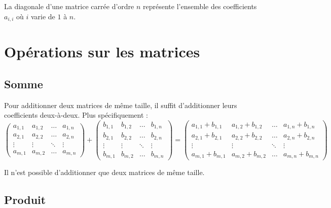 	\begin{tip}
		La diagonale d'une matrice carrée d'ordre $n$ représente l'ensemble des coefficients $a_{i,i}$ où $i$ varie de $1$ à $n$.
	\end{tip}

	\section{Opérations sur les matrices}

	\subsection{Somme}

	\begin{formula}
		\contentwidth[big]
		Pour additionner deux matrices de même taille, il suffit d'additionner leurs coefficients deux-à-deux. Plus spécifiquement :
		\newpar
		$\displaystyle \begin{pmatrix}a_{1,1} & a_{1,2} & \dots & a_{1,n} \\ a_{2,1} & a_{2,2} & \dots & a_{2,n} \\ \vdots & \vdots & \ddots & \vdots \\ a_{m,1} & a_{m,2} & \dots & a_{m,n}\end{pmatrix} + \begin{pmatrix}b_{1,1} & b_{1,2} & \dots & b_{1,n} \\ b_{2,1} & b_{2,2} & \dots & b_{2,n} \\ \vdots & \vdots & \ddots & \vdots \\ b_{m,1} & b_{m,2} & \dots & b_{m,n}\end{pmatrix} = \begin{pmatrix}a_{1,1} + b_{1,1} & a_{1,2} + b_{1,2} & \dots & a_{1,n} + b_{1,n} \\ a_{2,1} + b_{2,1} & a_{2,2} + b_{2,2} & \dots & a_{2,n} + b_{2,n} \\ \vdots & \vdots & \ddots & \vdots \\ a_{m,1} + b_{m,1} & a_{m,2} + b_{m,2} & \dots & a_{m,n} + b_{m,n}\end{pmatrix}$
	\end{formula}

	\begin{tip}[Attention !]
		Il n'est possible d'additionner que deux matrices de même taille.
	\end{tip}

	\subsection{Produit}

